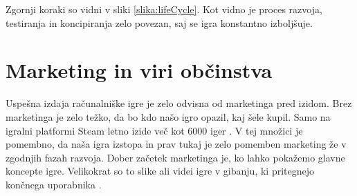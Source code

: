 \documentclass[12pt,a4paper,twoside]{book}
\begin{document}
Zgornji koraki so vidni v sliki \ref{slika:lifeCycle}. Kot vidno je proces razvoja, testiranja in koncipiranja zelo povezan, saj se igra konstantno izboljšuje.

\section{Marketing in viri občinstva}
Uspešna izdaja računalniške igre je zelo odvisna od marketinga pred izidom. Brez marketinga je zelo težko, da bo kdo našo igro opazil, kaj šele kupil. Samo na igralni platformi Steam letno izide več kot 6000 iger \cite{james6000Games}. V tej množici je pomembno, da naša igra izstopa in prav tukaj je zelo pomemben marketing že v zgodnjih fazah razvoja. Dober začetek marketinga je, ko lahko pokažemo glavne koncepte igre. Velikokrat so to slike ali videi igre v gibanju, ki pritegnejo končnega uporabnika \cite{robertMarketing}.
\end{document}
